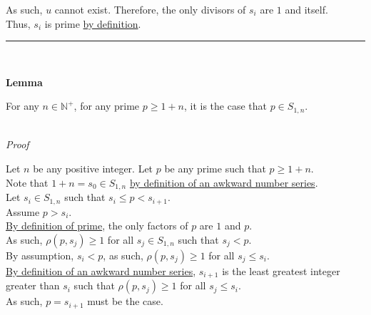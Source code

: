\documentclass[a4paper,12pt]{article}
\begin{document}
\noindent As such, $u$ cannot exist. Therefore, the only divisors of $s_i$ are $1$ and itself.\\

\noindent Thus, $s_i$ is prime \hyperlink{definition:prime_numbers}{by definition}.

\begin{center}
\noindent\rule{8cm}{0.4pt}
\end{center}
\noindent \\






\label{lemma:primes_in_asn}
\hypertarget{lemma:primes_in_asn}{}
\begin{tcolorbox}
\textbf{Lemma}

For any $n \in \mathbb{N}^+$, for any prime $p \geq 1 + n$, it is the case that $p \in S_{1, n}$.
\end{tcolorbox}

\noindent \\
\textit{Proof}

\noindent Let $n$ be any positive integer. Let $p$ be any prime such that $p \geq 1 + n$.\\

\noindent Note that $1 + n = s_0 \in S_{1, n}$ \hyperlink{definition:awkward_number_series}{by definition of an awkward number series}.\\

\noindent Let $s_i \in S_{1, n}$ such that $s_i \leq p < s_{i + 1}$.\\

\noindent Assume $p > s_i$.\\

\noindent \hyperlink{definition:prime_numbers}{By definition of prime}, the only factors of $p$ are $1$ and $p$.\\

\noindent As such, $\rho(p, s_j) \geq 1$ for all $s_j \in S_{1, n}$ such that $s_j < p$.\\

\noindent By assumption, $s_i < p$, as such, $\rho(p, s_j) \geq 1$ for all $s_j \leq s_i$.\\

\noindent \hyperlink{definition:awkward_number_series}{By definition of an awkward number series}, $s_{i + 1}$ is the least greatest integer greater than $s_i$ such that $\rho(p, s_j) \geq 1$ for all $s_j \leq s_i$.\\

\noindent As such, $p = s_{i + 1}$ must be the case.\\
\end{document}
